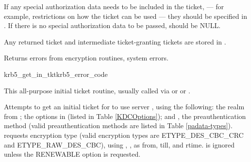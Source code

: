If any special authorization data needs to be included in the ticket,
--- for example, restrictions on how the ticket can be used --- 
they should be specified in .   If there
is no special authorization data to be passed,
 should be NULL.

Any returned ticket and intermediate ticket-granting tickets are
stored in .

Returns errors from encryption routines, system errors.

\begin{funcdecl}{krb5_get_in_tkt}{krb5_error_code}{\funcinout}
\funcin
{}
\funcendfuncarg
{}
\funcendfuncarg
{}
\funcinout
{}
\end{funcdecl}

This all-purpose initial ticket routine, usually called via
 or
 or
.


Attempts to get an initial ticket for 
to use server , using the following:
the realm from ; the options in
 (listed in Table \ref{KDCOptions});
and , the preauthentication
method (valid preauthentication methods are listed in Table
\ref{padata-types}).
 requests encryption type
 (valid encryption types are ETYPE_DES_CBC_CRC and
ETYPE_RAW_DES_CBC),
using ,
,
as from, till, and rtime.   is
ignored unless the RENEWABLE option is requested.

